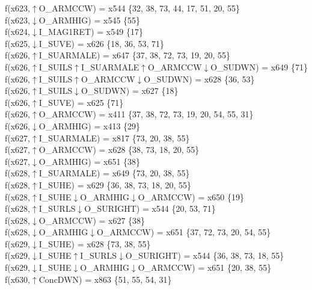 f(x623,$\uparrow$O\_ARMCCW) = x544 \{32, 38, 73, 44, 17, 51, 20, 55\} \\  
f(x623,$\downarrow$O\_ARMHIG) = x545 \{55\} \\  
f(x624,$\downarrow$I\_MAG1RET) = x549 \{17\} \\  
f(x625,$\downarrow$I\_SUVE) = x626 \{18, 36, 53, 71\} \\  
f(x626,$\uparrow$I\_SUARMALE) = x647 \{37, 38, 72, 73, 19, 20, 55\} \\  
f(x626,$\uparrow$I\_SUILS$\uparrow$I\_SUARMALE$\uparrow$O\_ARMCCW$\downarrow$O\_SUDWN) = x649 \{71\} \\  
f(x626,$\uparrow$I\_SUILS$\uparrow$O\_ARMCCW$\downarrow$O\_SUDWN) = x628 \{36, 53\} \\  
f(x626,$\uparrow$I\_SUILS$\downarrow$O\_SUDWN) = x627 \{18\} \\  
f(x626,$\uparrow$I\_SUVE) = x625 \{71\} \\  
f(x626,$\uparrow$O\_ARMCCW) = x411 \{37, 38, 72, 73, 19, 20, 54, 55, 31\} \\  
f(x626,$\downarrow$O\_ARMHIG) = x413 \{29\} \\  
f(x627,$\uparrow$I\_SUARMALE) = x817 \{73, 20, 38, 55\} \\  
f(x627,$\uparrow$O\_ARMCCW) = x628 \{38, 73, 18, 20, 55\} \\  
f(x627,$\downarrow$O\_ARMHIG) = x651 \{38\} \\  
f(x628,$\uparrow$I\_SUARMALE) = x649 \{73, 20, 38, 55\} \\  
f(x628,$\uparrow$I\_SUHE) = x629 \{36, 38, 73, 18, 20, 55\} \\  
f(x628,$\uparrow$I\_SUHE$\downarrow$O\_ARMHIG$\downarrow$O\_ARMCCW) = x650 \{19\} \\  
f(x628,$\uparrow$I\_SURLS$\downarrow$O\_SURIGHT) = x544 \{20, 53, 71\} \\  
f(x628,$\downarrow$O\_ARMCCW) = x627 \{38\} \\  
f(x628,$\downarrow$O\_ARMHIG$\downarrow$O\_ARMCCW) = x651 \{37, 72, 73, 20, 54, 55\} \\  
f(x629,$\downarrow$I\_SUHE) = x628 \{73, 38, 55\} \\  
f(x629,$\downarrow$I\_SUHE$\uparrow$I\_SURLS$\downarrow$O\_SURIGHT) = x544 \{36, 38, 73, 18, 55\} \\  
f(x629,$\downarrow$I\_SUHE$\downarrow$O\_ARMHIG$\downarrow$O\_ARMCCW) = x651 \{20, 38, 55\} \\  
f(x630,$\uparrow$ConcDWN) = x863 \{51, 55, 54, 31\} \\  

